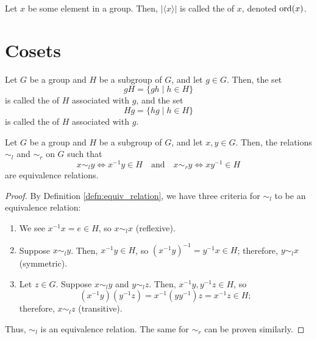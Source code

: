 \begin{defn}
Let $ x $ be some element in a group. Then, $ \lvert\langle x\rangle\rvert $ is called the  of $ x $, denoted $ \operatorname{ord}(x) $.
\end{defn}

\section{Cosets}

\begin{defn}
Let $ G $ be a group and $ H $ be a subgroup of $ G $, and let $ g\in G $. Then, the set
\begin{equation*}
    gH=\{gh\mid h\in H\}
\end{equation*}
is called the  of $ H $ associated with $ g $, and the set
\begin{equation*}
    Hg=\{hg\mid h\in H\}
\end{equation*}
is called the  of $ H $ associated with $ g $.
\end{defn}

\begin{thm}\label{thm:coset_relations}
Let $ G $ be a group and $ H $ be a subgroup of $ G $, and let $ x,y\in G $. Then, the relations $ \sim_l $ and $ \sim_r $ on $ G $ such that
\begin{equation*}
    x\sim_l y\iff x^{-1}y\in H \quad\text{and}\quad x\sim_r y\iff xy^{-1}\in H
\end{equation*}
are equivalence relations.
\end{thm}
\begin{proof}
By Definition \ref{defn:equiv_relation}, we have three criteria for $ \sim_l $ to be an equivalence relation:
\begin{enumerate}
    \item We see $ x^{-1}x=e\in H $, so $ x\sim_l x $ (reflexive).
    \item Suppose $ x\sim_l y $. Then, $ x^{-1}y\in H $, so $ (x^{-1}y)^{-1}=y^{-1}x\in H $; therefore, $ y\sim_l x $ (symmetric).
    \item Let $ z\in G $. Suppose $ x\sim_l y $ and $ y\sim_l z $. Then, $ x^{-1}y,y^{-1}z\in H $, so
    \begin{equation*}
        (x^{-1}y)(y^{-1}z)=x^{-1}(yy^{-1})z=x^{-1}z\in H;
    \end{equation*}
    therefore, $ x\sim_l z $ (transitive).
\end{enumerate}
Thus, $ \sim_l $ is an equivalence relation. The same for $ \sim_r $ can be proven similarly.
\end{proof}


